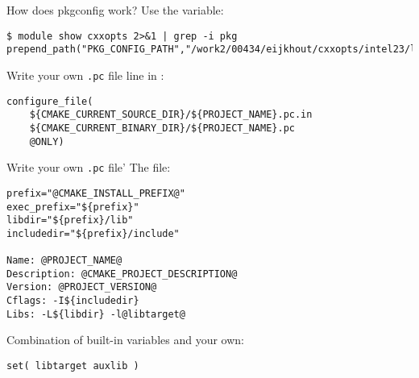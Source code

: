 
\lstset{language=bash}


\begin{numberedframe}{How does pkgconfig work?}
Use the  variable:
\begin{lstlisting}
$ module show cxxopts 2>&1 | grep -i pkg
prepend_path("PKG_CONFIG_PATH","/work2/00434/eijkhout/cxxopts/intel23/lib64/pkgconfig")
\end{lstlisting}
\end{numberedframe}

\begin{numberedframe}{Write your own \texttt{.pc} file}
 line in :
\begin{lstlisting}
configure_file(
    ${CMAKE_CURRENT_SOURCE_DIR}/${PROJECT_NAME}.pc.in
    ${CMAKE_CURRENT_BINARY_DIR}/${PROJECT_NAME}.pc
    @ONLY)
\end{lstlisting}
\end{numberedframe}

\begin{numberedframe}{Write your own \texttt{.pc} file'}
The  file:
\begin{lstlisting}
prefix="@CMAKE_INSTALL_PREFIX@"
exec_prefix="${prefix}"
libdir="${prefix}/lib"
includedir="${prefix}/include"

Name: @PROJECT_NAME@
Description: @CMAKE_PROJECT_DESCRIPTION@
Version: @PROJECT_VERSION@
Cflags: -I${includedir}
Libs: -L${libdir} -l@libtarget@
\end{lstlisting}
Combination of built-in variables and your own:
\begin{lstlisting}
set( libtarget auxlib )
\end{lstlisting}
\end{numberedframe}

